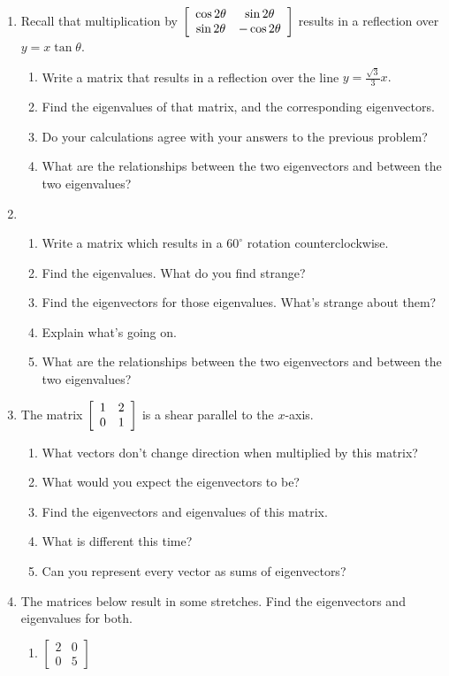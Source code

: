 \documentclass[../gatm.tex]{subfiles}
\begin{document}
\begin{enumerate}
\item Recall that multiplication by $\left[\begin{array}{cc} \cos 2\theta & \sin 2\theta \\ \sin 2\theta & -\cos 2\theta \end{array}\right]$ results in a reflection over $y=x\tan \theta$.
\begin{enumerate}
\item Write a matrix that results in a reflection over the line $y=\frac{\sqrt{3}}{3}x.$
\item Find the eigenvalues of that matrix, and the corresponding eigenvectors.
\item Do your calculations agree with your answers to the previous problem?
\item What are the relationships between the two eigenvectors and between the two eigenvalues?
\end{enumerate}
\item \begin{enumerate}
\item Write a matrix which results in a $60^\circ$ rotation counterclockwise.
\item Find the eigenvalues. What do you find strange?
\item Find the eigenvectors for those eigenvalues. What's strange about them?
\item Explain what's going on.
\item What are the relationships between the two eigenvectors and between the two eigenvalues?
\end{enumerate}
\item The matrix $\left[\begin{array}{cc} 1 & 2 \\ 0 & 1 \end{array}\right]$ is a shear parallel to the $x$-axis.
\begin{enumerate}
\item What vectors don't change direction when multiplied by this matrix?
\item What would you expect the eigenvectors to be?
\item Find the eigenvectors and eigenvalues of this matrix.
\item What is different this time?
\item Can you represent every vector as sums of eigenvectors?
\end{enumerate}
\item The matrices below result in some stretches. Find the eigenvectors and eigenvalues for both.
\begin{multicols}{2}
\begin{enumerate}
\item $\left[\begin{smallmatrix} 2 & 0 \\ 0 & 5 \end{smallmatrix}\right]$

\end{enumerate}
\end{multicols}
\end{enumerate}
\end{document}
